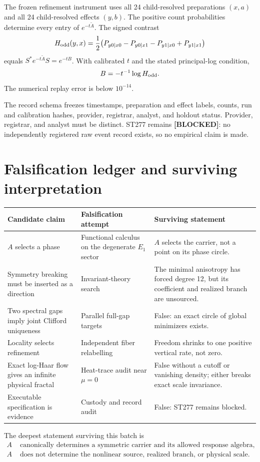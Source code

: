 \documentclass[11pt,a4paper]{article}
\newcommand{\Blocked}{\textcolor{blocked}{\textbf{[BLOCKED]}}}
\begin{document}
The frozen refinement instrument uses all 24 child-resolved preparations $(x,a)$ and all
24 child-resolved effects $(y,b)$. The positive count probabilities determine every entry
of $e^{-t\widetilde A}$. The signed contrast
\[
H_{\rm odd}(y,x)=\frac12\bigl(
P_{y0|x0}-P_{y0|x1}-P_{y1|x0}+P_{y1|x1}\bigr)
\]
equals $S^*e^{-t\widetilde A}S=e^{-tB}$. With calibrated $t$ and the stated principal-log
condition,
\[
B=-t^{-1}\log H_{\rm odd}.
\]
The numerical replay error is below $10^{-14}$.

The record schema freezes timestamps, preparation and effect labels, counts, run and
calibration hashes, provider, registrar, analyst, and holdout status. Provider, registrar,
and analyst must be distinct. ST277 remains \Blocked: no independently registered raw
event record exists, so no empirical claim is made.

\section{Falsification ledger and surviving interpretation}

\begin{longtable}{p{}p{}p{}}
\toprule
Candidate claim & Falsification attempt & Surviving statement \\
\midrule\endhead
$A$ selects a phase & Functional calculus on the degenerate $E_1$ sector & $A$ selects the carrier, not a point on its phase circle. \\
Symmetry breaking must be inserted as a direction & Invariant-theory search & The minimal anisotropy has forced degree 12, but its coefficient and realized branch are unsourced. \\
Two spectral gaps imply joint Clifford uniqueness & Parallel full-gap targets & False: an exact circle of global minimizers exists. \\
Locality selects refinement & Independent fiber relabelling & Freedom shrinks to one positive vertical rate, not zero. \\
Exact log-Haar flow gives an infinite physical fractal & Heat-trace audit near $\mu=0$ & False without a cutoff or vanishing density; either breaks exact scale invariance. \\
Executable specification is evidence & Custody and record audit & False: ST277 remains blocked. \\
\bottomrule
\end{longtable}

The deepest statement surviving this batch is
\begin{align*}
A&\text{ canonically determines a symmetric carrier and its allowed response algebra},\\
A&\text{ does not determine the nonlinear source, realized branch, or physical scale}.
\end{align*}
\end{document}

